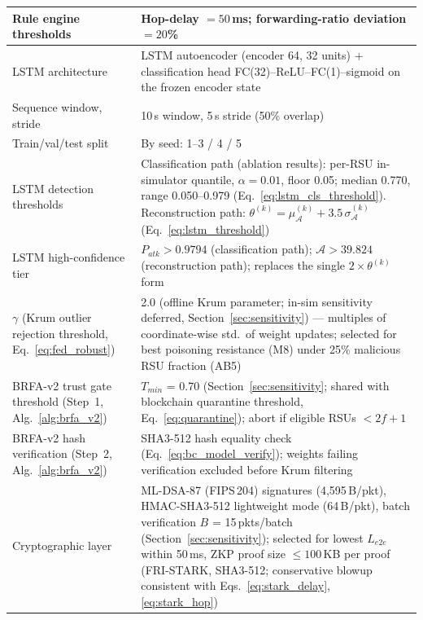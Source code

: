 \documentclass[12pt, a4paper]{report}
\begin{document}
{{\begin{longtable}{|m{5.0cm}|m{9.0cm}|}
            \hline
            Rule engine thresholds & Hop-delay $= 50$\,ms; forwarding-ratio deviation $= 20$\% \\
            \hline
            LSTM architecture & LSTM autoencoder (encoder 64, 32 units) + classification head FC(32)--ReLU--FC(1)--sigmoid on the frozen encoder state \\
            \hline
            Sequence window, stride & 10\,s window, 5\,s stride (50\% overlap) \\
            \hline
            Train/val/test split & By seed: 1--3 / 4 / 5 \\
            \hline
            LSTM detection thresholds & Classification path (ablation results): per-\ac{RSU} in-simulator quantile, $\alpha=0.01$, floor 0.05; median 0.770, range 0.050--0.979 (Eq.~\ref{eq:lstm_cls_threshold}). Reconstruction path: $\theta^{(k)} = \mu_{\mathcal{A}}^{(k)} + 3.5\,\sigma_{\mathcal{A}}^{(k)}$ (Eq.~\ref{eq:lstm_threshold}) \\
\hline LSTM high-confidence tier & $P_{atk}>0.9794$ (classification path); $\mathcal{A}>39.824$ (reconstruction path); replaces the single $2\times\theta^{(k)}$ form \\           
            \hline
              $\gamma$ (Krum outlier rejection threshold, Eq.~\ref{eq:fed_robust}) & 2.0 (offline Krum parameter; in-sim sensitivity deferred, Section~\ref{sec:sensitivity}) --- multiples of coordinate-wise std.\ of weight updates;   selected for best poisoning resistance (M8) under 25\% malicious RSU fraction (AB5) \\
            \hline
              BRFA-v2 trust gate threshold (Step~1, Alg.~\ref{alg:brfa_v2}) &              $T_{min}$ = 0.70 (Section~\ref{sec:sensitivity}; shared with blockchain quarantine threshold, Eq.~\ref{eq:quarantine}); abort if eligible RSUs $< 2f{+}1$ \\
             \hline
              BRFA-v2 hash verification (Step~2, Alg.~\ref{alg:brfa_v2}) &              SHA3-512 hash equality check (Eq.~\ref{eq:bc_model_verify}); weights failing
              verification excluded before Krum filtering \\
              \hline
            Cryptographic layer & ML-DSA-87 (FIPS\,204) signatures (4,595\,B/pkt),
            HMAC-SHA3-512 lightweight mode (64\,B/pkt),
            batch verification $B$ = 15\,pkts/batch (Section~\ref{sec:sensitivity});
            selected for lowest $L_{e2e}$ within 50\,ms,  ZKP proof size  $\leq 100$\,KB per proof   (FRI-STARK, SHA3-512; conservative blowup
             consistent with Eqs.~\ref{eq:stark_delay},
            \ref{eq:stark_hop}) \\


\end{longtable}}}
\end{document}
